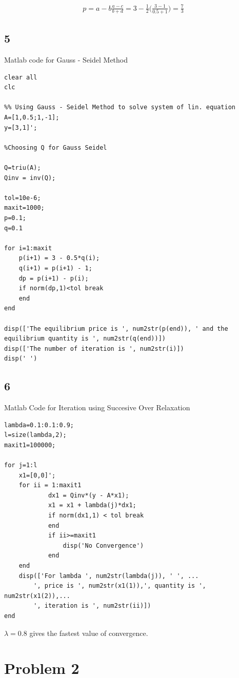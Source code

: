 \documentclass[12pt]{report}
\begin{document}
\begin{equation}
\begin{aligned}
p = a - b \frac{a - c}{b + d} = 3 - \frac{1}{2}\bigg(\frac{3 - 1}{0.5 + 1}\bigg) = \frac{7}{3}
\end{aligned}
\end{equation}

\subsection*{5}
Matlab code for Gauss - Seidel Method
\begin{lstlisting}
clear all
clc

%% Using Gauss - Seidel Method to solve system of lin. equation
A=[1,0.5;1,-1];
y=[3,1]';

%Choosing Q for Gauss Seidel

Q=triu(A);
Qinv = inv(Q);

tol=10e-6;
maxit=1000;
p=0.1;
q=0.1

for i=1:maxit
    p(i+1) = 3 - 0.5*q(i);
    q(i+1) = p(i+1) - 1;
    dp = p(i+1) - p(i);
    if norm(dp,1)<tol break
    end
end

disp(['The equilibrium price is ', num2str(p(end)), ' and the equilibrium quantity is ', num2str(q(end))])
disp(['The number of iteration is ', num2str(i)])
disp(' ')

\end{lstlisting}

\subsection*{6}
Matlab Code for Iteration using Succesive Over Relaxation
\begin{lstlisting}
lambda=0.1:0.1:0.9;
l=size(lambda,2);
maxit1=100000;

for j=1:l
    x1=[0,0]';
    for ii = 1:maxit1
            dx1 = Qinv*(y - A*x1);
            x1 = x1 + lambda(j)*dx1;
            if norm(dx1,1) < tol break
            end
            if ii>=maxit1
                disp('No Convergence')
            end
    end
    disp(['For lambda ', num2str(lambda(j)), ' ', ...
        ', price is ', num2str(x1(1)),', quantity is ', num2str(x1(2)),...
        ', iteration is ', num2str(ii)])
end
\end{lstlisting}

$\lambda = 0.8$ gives the fastest value of convergence.

\section*{Problem 2}
\end{document}
